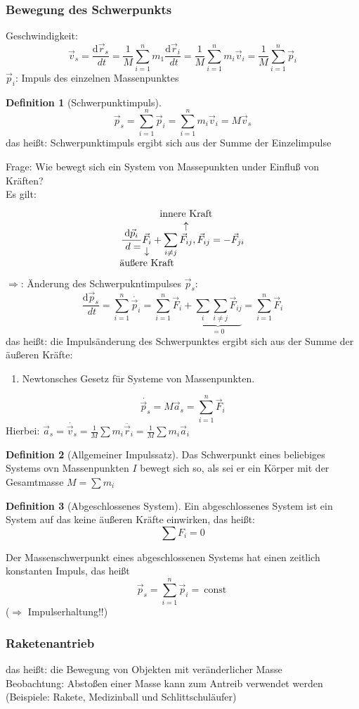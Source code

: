 \documentclass[a4paper]{scrartcl}
\renewcommand{\d}{\mathrm{d}}
\renewcommand{\v}[1]{\vec{#1}}
\newcommand{\dd}[2]{\frac{\d #1}{\ d#2}}
\theoremstyle{definition}
\newtheorem{defn}{Definition}
\theoremstyle{plain}
\theoremstyle{plain}
\theoremstyle{remark}
\theoremstyle{remark}
\theoremstyle{remark}
\begin{document}
\subsubsection{Bewegung des Schwerpunkts}
\label{sec-6-1-1}
Geschwindigkeit:
\[\v v_s = \dd{\v r_s}{t} = \frac{1}{M} \sum_{i = 1}^n m_1 \dd{\v r_i}{t} = \frac{1}{M} \sum_{i = 1}^n m_i \v v_i = \frac{1}{M}\sum_{i = 1}^n \v p_i\]
$\v p_i$: Impuls des einzelnen Massenpunktes
\begin{defn}[Schwerpunktimpuls]
\[\v p_s = \sum_{i = 1}^{n}\v p_i = \sum_{i = 1}^{n} m_i \v v_i = M \v v_s\]
das heißt: Schwerpunktimpuls ergibt sich aus der Summe der Einzelimpulse
\end{defn}
Frage: Wie bewegt sich ein System von Massepunkten under Einfluß von Kräften? \\
    Es gilt:
\[\dd{\v p_i} = \underarrow[\v F_i]{äußere Kraft} + \sum_{i\neq j}^{}\overarrow[\v F_{i j}]{innere Kraft}, \v F_{ij} = - \v F_{j i}\]
$\Rightarrow$: Änderung des Schwerpukntimpulses $\v p_s$:
\[ \dd{\v p_s}{t} = \sum_{i = 1}^{n}\dot{\v p_i} = \sum_{i = 1}^{n}\v F_i + \underbrace{ \sum_{i} \sum_{i\neq j} \v F_{ij}}_{= 0} = \sum_{i = 1}^{n} \v F_i\]
das heißt: die Impulsänderung des Schwerpunktes ergibt sich aus der Summe der äußeren Kräfte:
\begin{enumerate}
\item Newtonsches Gesetz für Systeme von Massenpunkten.
\end{enumerate}
\[\dot{\v p_s} = M \v a_s = \sum_{i = 1}^{n}\v F_i\]
Hierbei: $\v a_s = \dot{\v v_s} = \frac{1}{M} \sum m_i \ddot{\v r_i} = \frac{1}{M} \sum m_i \v a_i$

\begin{defn}[Allgemeiner Impulssatz]
Das Schwerpunkt eines beliebiges Systems ovn Massenpunkten $I$ bewegt sich so, als sei er ein Körper mit der Gesamtmasse $M = \sum m_i$
\end{defn}
\begin{defn}[Abgeschlossenes System]
Ein abgeschlossenes System ist ein System auf das keine äußeren Kräfte einwirken, das heißt:
\[\sum F_i = 0\]
\end{defn}

Der Massenschwerpunkt eines abgeschlossenen Systems hat einen zeitlich konstanten Impuls, das heißt
\[\v p_s = \sum_{i = 1}^{n} \v p_i =~\text{const}~\]
($\Rightarrow$ Impulserhaltung!!)
\subsubsection{Raketenantrieb}
\label{sec-6-1-2}
das heißt: die Bewegung von Objekten mit veränderlicher Masse \\
    Beobachtung: Abstoßen einer Masse kann zum Antreib verwendet werden (Beispiele: Rakete, Medizinball und Schlittschuläufer)
\end{document}
